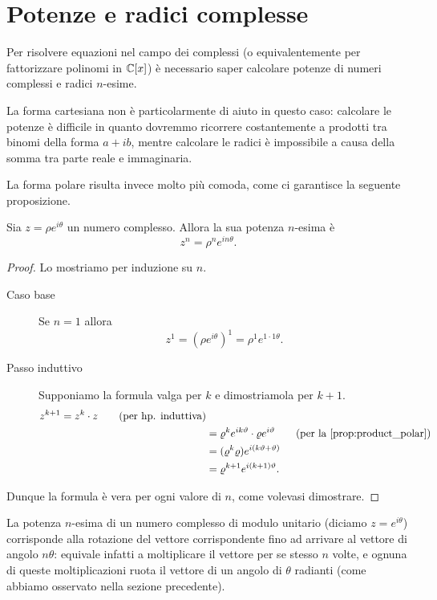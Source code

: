 \section{Potenze e radici complesse}

Per risolvere equazioni nel campo dei complessi (o equivalentemente per fattorizzare polinomi in $\mathbb{C}[x]$) è necessario saper calcolare potenze di numeri complessi e radici $n$-esime.

La forma cartesiana non è particolarmente di aiuto in questo caso: calcolare le potenze è difficile in quanto dovremmo ricorrere costantemente a prodotti tra binomi della forma $a+ib$, mentre calcolare le radici è impossibile a causa della somma tra parte reale e immaginaria.

La forma polare risulta invece molto più comoda, come ci garantisce la seguente proposizione.
\begin{proposition}
    Sia $z = \rho e^{i\theta}$ un numero complesso. Allora la sua potenza $n$-esima è \begin{equation}
        z^n = \rho^n e^{in\theta}.
    \end{equation}
\end{proposition}
\begin{proof}
    Lo mostriamo per induzione su $n$.
    \begin{description}
        \item[Caso base] Se $n = 1$ allora \[
            z^1 = (\rho e^{i\theta})^1 = \rho^1 e^{1 \cdot 1\theta}.    
        \] 
        \item[Passo induttivo] Supponiamo la formula valga per $k$ e dimostriamola per $k + 1$.
        \begin{align*}
            z^{k+1} = z^k \cdot z \tag{per hp. induttiva}\\
            &= \rho^k e^{ik\theta} \cdot \rho e^{i\theta} \tag{per la \autoref{prop:product_polar}}\\
            &= (\rho^k \rho) e^{i(k\theta+\theta)} \\
            &= \rho^{k+1} e^{i(k+1)\theta}.
        \end{align*} 
    \end{description}
    Dunque la formula è vera per ogni valore di $n$, come volevasi dimostrare.
\end{proof}

La potenza $n$-esima di un numero complesso di modulo unitario (diciamo $z = e^{i\theta}$) corrisponde alla rotazione del vettore corrispondente fino ad arrivare al vettore di angolo $n\theta$: equivale infatti a moltiplicare il vettore per se stesso $n$ volte, e ognuna di queste moltiplicazioni ruota il vettore di un angolo di $\theta$ radianti (come abbiamo osservato nella sezione precedente).

